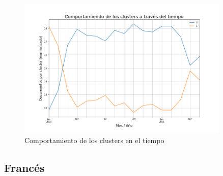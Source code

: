 \begin{figure}
    \centering
    \includegraphics[width=0.9\textwidth]{results/TopicDetection/es/cluster_over_time.png}
    \caption{Comportamiento de los clusters en el tiempo}
    \label{fig:es_time}
\end{figure}

\subsection{Francés}